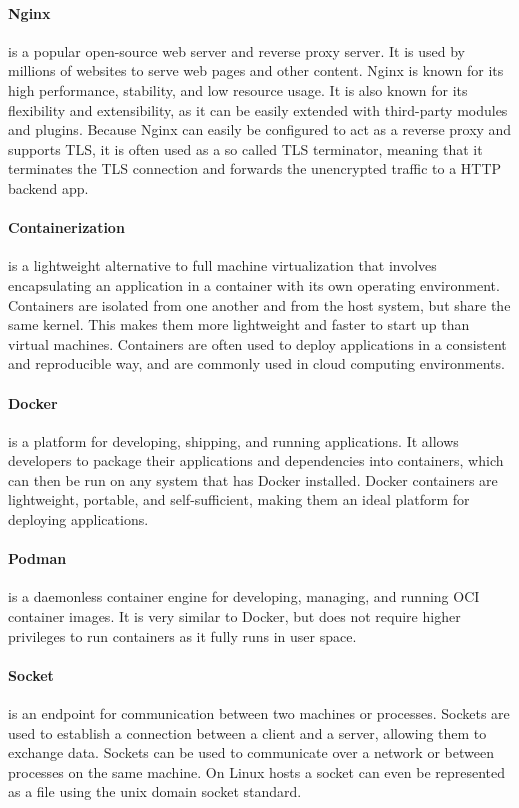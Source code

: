 \documentclass[12pt]{scrbook}
\begin{document}
\paragraph{Nginx} is a popular open-source web server and reverse proxy server. It is
used by millions of websites to serve web pages and other content. Nginx is
known for its high performance, stability, and low resource usage. It is also
known for its flexibility and extensibility, as it can be easily extended with
third-party modules and plugins. Because Nginx can easily be configured to act
as a reverse proxy and supports TLS, it is often used as a so called TLS
terminator, meaning that it terminates the TLS connection and forwards the
unencrypted traffic to a HTTP backend app.

\paragraph{Containerization}
is a lightweight alternative to full machine virtualization that involves encapsulating an application in a container with its own operating environment. Containers are isolated from one another and from the host system, but share the same kernel. This makes them more lightweight and faster to start up than virtual machines. Containers are often used to deploy applications in a consistent and reproducible way, and are commonly used in cloud computing environments.

\paragraph{Docker} is a platform for
developing, shipping, and running applications. It allows developers to package
their applications and dependencies into containers, which can then be run on
any system that has Docker installed. Docker containers are lightweight,
portable, and self-sufficient, making them an ideal platform for deploying applications.

\paragraph{Podman} is a daemonless container engine for developing, managing, and running OCI container images. It is very similar to Docker, but does not require higher privileges to run containers as it fully runs in user space.

\paragraph{Socket} is an endpoint for communication between two machines or processes. Sockets are used to establish a connection between a client and a server, allowing them to exchange data. Sockets can be used to communicate over a network or between processes on the same machine. On Linux hosts a socket can even be represented as a file using the unix domain socket standard.
\end{document}
